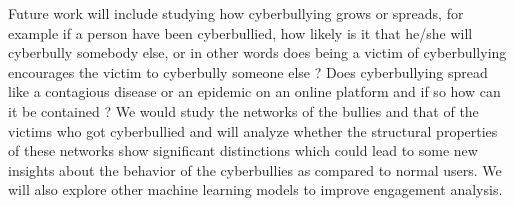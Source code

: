 \newpage
Future work will include studying how cyberbullying grows or spreads, for example if a person have been cyberbullied, how likely is it that he/she will cyberbully somebody else, or in other words does being a victim of cyberbullying encourages the victim to cyberbully someone else ? Does cyberbullying spread like a contagious disease or an epidemic on an online platform and if so how can it be contained ? We would study the networks of the bullies and that of the victims who got cyberbullied and will analyze whether the structural properties of these networks show significant distinctions which could lead to some new insights about the behavior of the cyberbullies as compared to normal users. We will also explore other machine learning models to improve engagement analysis.

